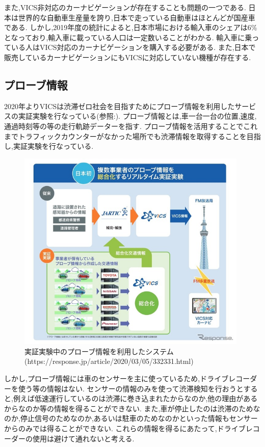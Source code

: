 また,VICS非対応のカーナビゲーションが存在することも問題の一つである.
日本は世界的な自動車生産量を誇り,日本で走っている自動車はほとんどが国産車である.
しかし,2019年度の統計によると,日本市場における輸入車のシェアは6\%となっており,輸入車に載っている人口は一定数いることがわかる.
輸入車に乗っている人はVICS対応のカーナビゲーションを購入する必要がある.
また,日本で販売しているカーナビゲーションにもVICSに対応していない機種が存在する.

\subsection{プローブ情報}
2020年よりVICSは渋滞ゼロ社会を目指すためにプローブ情報を利用したサービスの実証実験を行なっている(参照:).
プローブ情報とは,車一台一台の位置,速度,通過時刻等の等の走行軌跡データーを指す.
プローブ情報を活用することでこれまでトラフィックカウンターがなかった場所でも渋滞情報を取得することを目指し,実証実験を行なっている.

\begin{figure}[htbp]
  \begin{center}
   \includegraphics[width=11cm]{figs/probe.jpg}
  \end{center}
  \caption{実証実験中のプローブ情報を利用したシステム(https://response.jp/article/2020/03/05/332331.html)}
  \label{fig:probe}
\end{figure}

しかし,プローブ情報には車のセンサーを主に使っているため,ドライブレコーダーを使う等の情報はない.
センサーの情報のみを使って渋滞検知を行おうとすると,例えば低速運行しているのは渋滞に巻き込まれたからなのか,他の理由があるからなのか等の情報を得ることができない.
また,車が停止したのは渋滞のためなのか,停止信号のためなのか,あるいは駐車のためなのかといった情報もセンサーからのみでは得ることができない.
これらの情報を得るにあたって,ドライブレコーダーの使用は避けて通れないと考える.

